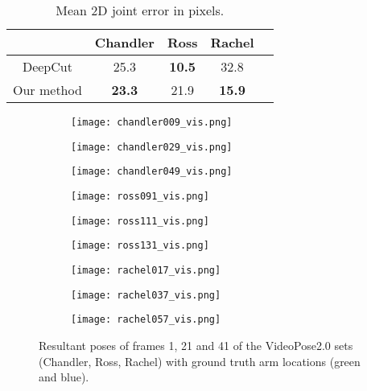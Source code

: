 \documentclass[10pt,twocolumn,letterpaper]{article}
\begin{document}
\begin{table}[t]
	\begin{center}
		\caption{Mean 2D joint error in pixels.}
		\label{tab:res2d}
		\begin{tabular}{ccccc}
			\hline 
			& Chandler & Ross & Rachel  \\ 
			\hline 
			DeepCut \cite{deepcut16cvpr} &  25.3 & \textbf{10.5}  & 32.8  \\ 
			Our method & \textbf{23.3} & 21.9 & \textbf{15.9}  \\
			\hline 
		\end{tabular}
	\end{center}
\end{table}

\begin{figure}
	\centering
	\begin{subfigure}[b]{0.33\linewidth}
		\texttt{[image: chandler009\_vis.png]}
	\end{subfigure}%
	\begin{subfigure}[b]{0.33\linewidth}
		\texttt{[image: chandler029\_vis.png]}
	\end{subfigure}%
	\begin{subfigure}[b]{0.33\linewidth}
		\texttt{[image: chandler049\_vis.png]}
	\end{subfigure}
	\begin{subfigure}[b]{0.33\linewidth}
		\texttt{[image: ross091\_vis.png]}
	\end{subfigure}%
	\begin{subfigure}[b]{0.33\linewidth}
		\texttt{[image: ross111\_vis.png]}
	\end{subfigure}%
	\begin{subfigure}[b]{0.33\linewidth}
		\texttt{[image: ross131\_vis.png]}
	\end{subfigure}
	\begin{subfigure}[b]{0.33\linewidth}
		\texttt{[image: rachel017\_vis.png]}
	\end{subfigure}%
	\begin{subfigure}[b]{0.33\linewidth}
		\texttt{[image: rachel037\_vis.png]}
	\end{subfigure}%
	\begin{subfigure}[b]{0.33\linewidth}
		\texttt{[image: rachel057\_vis.png]}
	\end{subfigure}
	\caption{Resultant poses of frames 1, 21 and 41 of the VideoPose2.0 sets (Chandler, Ross, Rachel) with ground truth arm locations (green and blue).}
	\label{fig:results_friends}
\end{figure}
\end{document}
